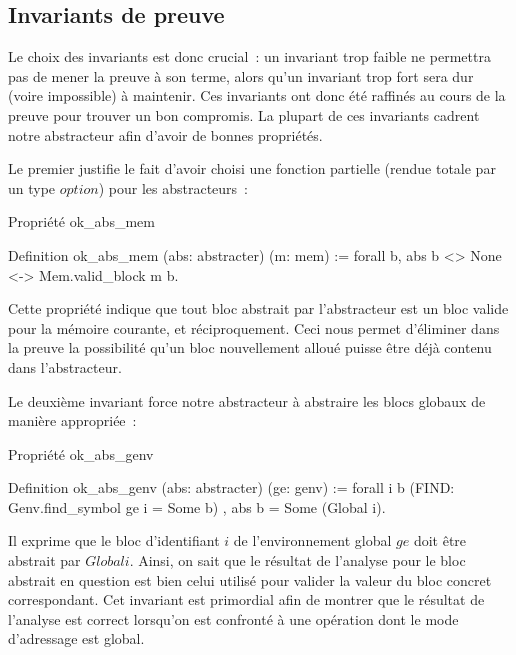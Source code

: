 \documentclass{article}
\begin{document}
\subsection{Invariants de preuve}

Le choix des invariants est donc crucial~: un invariant trop faible ne
permettra pas de mener la preuve à son terme, alors qu'un invariant trop fort
sera dur (voire impossible) à maintenir. Ces invariants ont donc été raffinés
au cours de la preuve pour trouver un bon compromis. La plupart de ces
invariants cadrent notre abstracteur afin d'avoir de bonnes propriétés.

Le premier justifie le fait d'avoir choisi une fonction partielle (rendue
totale par un type $option$) pour les abstracteurs~:

\begin{coqcode}
\caption{Propriété ok\_abs\_mem}
\begin{english}
\begin{coq}
Definition ok_abs_mem (abs: abstracter) (m: mem) :=
forall b, abs b <> None <-> Mem.valid_block m b.
\end{coq}
\end{english}
\end{coqcode}

Cette propriété indique que tout bloc abstrait par l'abstracteur est un bloc
valide pour la mémoire courante, et réciproquement. Ceci nous permet d'éliminer
dans la preuve la possibilité qu'un bloc nouvellement alloué puisse être déjà
contenu dans l'abstracteur.

Le deuxième invariant force notre abstracteur à abstraire les blocs globaux de
manière appropriée~:

\begin{coqcode}
\caption{Propriété ok\_abs\_genv}
\begin{english}
\begin{coq}
Definition ok_abs_genv (abs: abstracter) (ge: genv) :=
forall i b
  (FIND: Genv.find_symbol ge i = Some b)
  ,
  abs b = Some (Global i).
\end{coq}
\end{english}
\end{coqcode}

Il exprime que le bloc d'identifiant $i$ de l'environnement global
$ge$ doit être abstrait par $Global i$. Ainsi, on sait
que le résultat de l'analyse pour le bloc abstrait en question est bien celui
utilisé pour valider la valeur du bloc concret correspondant. Cet invariant est
primordial afin de montrer que le résultat de l'analyse est correct lorsqu'on
est confronté à une opération dont le mode d'adressage est global.
\end{document}
